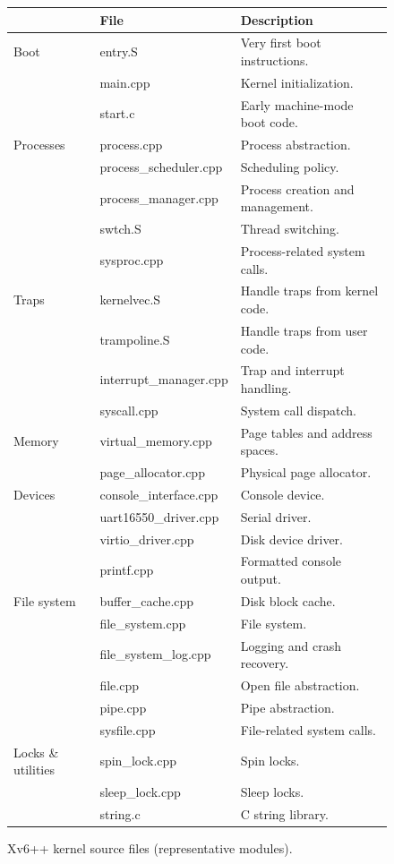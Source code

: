 \begin{figure}[H]
\center
\begin{tabular}{l|l|l}
& {\bf File} & {\bf Description} \\
\midrule
Boot & entry.S & Very first boot instructions. \\
 & main.cpp & Kernel initialization. \\
 & start.c & Early machine-mode boot code. \\
\midrule
Processes & process.cpp & Process abstraction. \\
 & process\_scheduler.cpp & Scheduling policy. \\
 & process\_manager.cpp & Process creation and management. \\
 & swtch.S & Thread switching. \\
 & sysproc.cpp & Process-related system calls. \\
\midrule
Traps & kernelvec.S & Handle traps from kernel code. \\
 & trampoline.S & Handle traps from user code. \\
 & interrupt\_manager.cpp & Trap and interrupt handling. \\
 & syscall.cpp & System call dispatch. \\
\midrule
Memory & virtual\_memory.cpp & Page tables and address spaces. \\
 & page\_allocator.cpp & Physical page allocator. \\
\midrule
Devices & console\_interface.cpp & Console device. \\
 & uart16550\_driver.cpp & Serial driver. \\
 & virtio\_driver.cpp & Disk device driver. \\
 & printf.cpp & Formatted console output. \\
\midrule
File system & buffer\_cache.cpp & Disk block cache. \\
 & file\_system.cpp & File system. \\
 & file\_system\_log.cpp & Logging and crash recovery. \\
 & file.cpp & Open file abstraction. \\
 & pipe.cpp & Pipe abstraction. \\
 & sysfile.cpp & File-related system calls. \\
\midrule
Locks \& utilities & spin\_lock.cpp & Spin locks. \\
 & sleep\_lock.cpp & Sleep locks. \\
 & string.c & C string library. \\
\end{tabular}
\caption{Xv6++ kernel source files (representative modules).}
\label{fig:source}
\end{figure}

